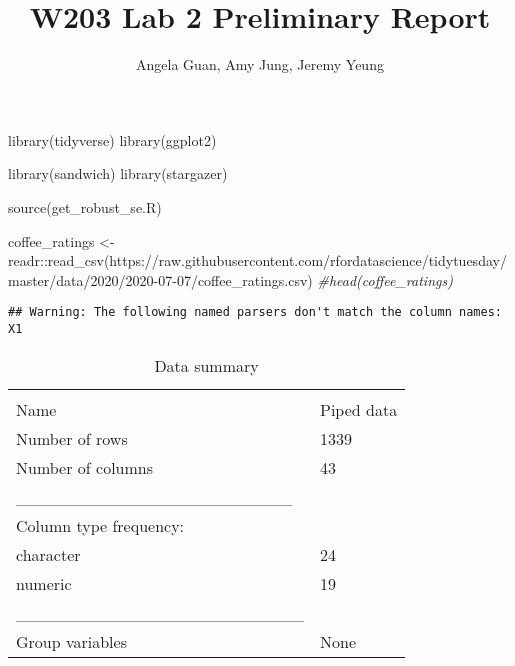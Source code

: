 \documentclass[
]{article}
\title{W203 Lab 2 Preliminary Report}
\author{Angela Guan, Amy Jung, Jeremy Yeung}
\date{}
\newenvironment{Shaded}{\begin{snugshade}}{\end{snugshade}}
\newcommand{\CommentTok}[1]{\textcolor[rgb]{0.56,0.35,0.01}{\textit{#1}}}
\newcommand{\FunctionTok}[1]{\textcolor[rgb]{0.00,0.00,0.00}{#1}}
\newcommand{\NormalTok}[1]{#1}
\newcommand{\OtherTok}[1]{\textcolor[rgb]{0.56,0.35,0.01}{#1}}
\newcommand{\SpecialCharTok}[1]{\textcolor[rgb]{0.00,0.00,0.00}{#1}}
\newcommand{\StringTok}[1]{\textcolor[rgb]{0.31,0.60,0.02}{#1}}
\begin{document}
\maketitle

\begin{Shaded}
\begin{Highlighting}[]
\FunctionTok{library}\NormalTok{(tidyverse)}
\FunctionTok{library}\NormalTok{(ggplot2) }

\FunctionTok{library}\NormalTok{(sandwich)}
\FunctionTok{library}\NormalTok{(stargazer)}

\FunctionTok{source}\NormalTok{(}\StringTok{\textquotesingle{}get\_robust\_se.R\textquotesingle{}}\NormalTok{)}
\end{Highlighting}
\end{Shaded}

\begin{Shaded}
\begin{Highlighting}[]
\NormalTok{coffee\_ratings }\OtherTok{\textless{}{-}}\NormalTok{ readr}\SpecialCharTok{::}\FunctionTok{read\_csv}\NormalTok{(}\StringTok{\textquotesingle{}https://raw.githubusercontent.com/rfordatascience/tidytuesday/master/data/2020/2020{-}07{-}07/coffee\_ratings.csv\textquotesingle{}}\NormalTok{)}
\CommentTok{\#head(coffee\_ratings)}
\end{Highlighting}
\end{Shaded}

\begin{verbatim}
## Warning: The following named parsers don't match the column names: X1
\end{verbatim}

\begin{longtable}[]{@{}ll@{}}
\caption{Data summary}\tabularnewline
\toprule
& \\
\midrule
\endfirsthead
\toprule
& \\
\midrule
\endhead
Name & Piped data \\
Number of rows & 1339 \\
Number of columns & 43 \\
\_\_\_\_\_\_\_\_\_\_\_\_\_\_\_\_\_\_\_\_\_\_\_ & \\
Column type frequency: & \\
character & 24 \\
numeric & 19 \\
\_\_\_\_\_\_\_\_\_\_\_\_\_\_\_\_\_\_\_\_\_\_\_\_ & \\
Group variables & None \\
\bottomrule
\end{longtable}
\end{document}
